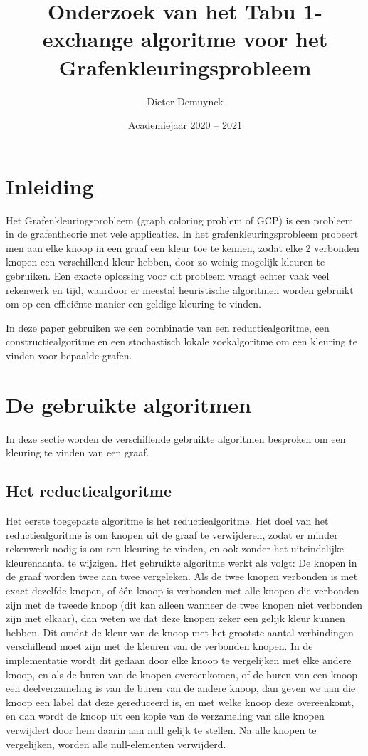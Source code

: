 \documentclass[a4paper,kulak]{kulakarticle} %
\date{Academiejaar 2020 -- 2021}
\title{Onderzoek van het Tabu 1-exchange algoritme voor het Grafenkleuringsprobleem}
\author{Dieter Demuynck}
\begin{document}
\maketitle

\section*{Inleiding}

Het Grafenkleuringsprobleem (graph coloring problem of GCP) is een probleem in de grafentheorie met vele applicaties. In het grafenkleuringsprobleem probeert men aan elke knoop in een graaf een kleur toe te kennen, zodat elke 2 verbonden knopen een verschillend kleur hebben, door zo weinig mogelijk kleuren te gebruiken. Een exacte oplossing voor dit probleem vraagt echter vaak veel rekenwerk en tijd, waardoor er meestal heuristische algoritmen worden gebruikt om op een efficiënte manier een geldige kleuring te vinden.

In deze paper gebruiken we een combinatie van een reductiealgoritme, een constructiealgoritme en een stochastisch lokale zoekalgoritme om een kleuring te vinden voor bepaalde grafen.

\section{De gebruikte algoritmen}

In deze sectie worden de verschillende gebruikte algoritmen besproken om een kleuring te vinden van een graaf.

\subsection{Het reductiealgoritme}

Het eerste toegepaste algoritme is het reductiealgoritme. Het doel van het reductiealgoritme is om knopen uit de graaf te verwijderen, zodat er minder rekenwerk nodig is om een kleuring te vinden, en ook zonder het uiteindelijke kleurenaantal te wijzigen. Het gebruikte algoritme werkt als volgt:
De knopen in de graaf worden twee aan twee vergeleken. Als de twee knopen verbonden is met exact dezelfde knopen, of één knoop is verbonden met alle knopen die verbonden zijn met de tweede knoop (dit kan alleen wanneer de twee knopen niet verbonden zijn met elkaar), dan weten we dat deze knopen zeker een gelijk kleur kunnen hebben. Dit omdat de kleur van de knoop met het grootste aantal verbindingen verschillend moet zijn met de kleuren van de verbonden knopen.
In de implementatie wordt dit gedaan door elke knoop te vergelijken met elke andere knoop, en als de buren van de knopen overeenkomen, of de buren van een knoop een deelverzameling is van de buren van de andere knoop, dan geven we aan die knoop een label dat deze gereduceerd is, en met welke knoop deze overeenkomt, en dan wordt de knoop uit een kopie van de verzameling van alle knopen verwijdert door hem daarin aan null gelijk te stellen. Na alle knopen te vergelijken, worden alle null-elementen verwijderd.
\end{document}
